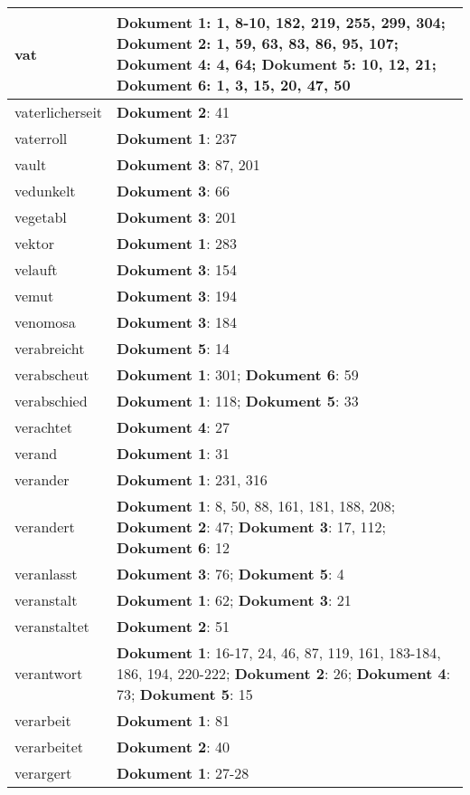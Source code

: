 \documentclass[a5paper]{article}
\begin{document}
\begin{longtable}[l]{|l|p{3in}|}
\hline
vat & \textbf{Dokument 1}: 1, 8-10, 182, 219, 255, 299, 304; \textbf{Dokument 2}: 1, 59, 63, 83, 86, 95, 107; \textbf{Dokument 4}: 4, 64; \textbf{Dokument 5}: 10, 12, 21; \textbf{Dokument 6}: 1, 3, 15, 20, 47, 50 \\
\hline
vaterlicherseit & \textbf{Dokument 2}: 41 \\
\hline
vaterroll & \textbf{Dokument 1}: 237 \\
\hline
vault & \textbf{Dokument 3}: 87, 201 \\
\hline
vedunkelt & \textbf{Dokument 3}: 66 \\
\hline
vegetabl & \textbf{Dokument 3}: 201 \\
\hline
vektor & \textbf{Dokument 1}: 283 \\
\hline
velauft & \textbf{Dokument 3}: 154 \\
\hline
vemut & \textbf{Dokument 3}: 194 \\
\hline
venomosa & \textbf{Dokument 3}: 184 \\
\hline
verabreicht & \textbf{Dokument 5}: 14 \\
\hline
verabscheut & \textbf{Dokument 1}: 301; \textbf{Dokument 6}: 59 \\
\hline
verabschied & \textbf{Dokument 1}: 118; \textbf{Dokument 5}: 33 \\
\hline
verachtet & \textbf{Dokument 4}: 27 \\
\hline
verand & \textbf{Dokument 1}: 31 \\
\hline
verander & \textbf{Dokument 1}: 231, 316 \\
\hline
verandert & \textbf{Dokument 1}: 8, 50, 88, 161, 181, 188, 208; \textbf{Dokument 2}: 47; \textbf{Dokument 3}: 17, 112; \textbf{Dokument 6}: 12 \\
\hline
veranlasst & \textbf{Dokument 3}: 76; \textbf{Dokument 5}: 4 \\
\hline
veranstalt & \textbf{Dokument 1}: 62; \textbf{Dokument 3}: 21 \\
\hline
veranstaltet & \textbf{Dokument 2}: 51 \\
\hline
verantwort & \textbf{Dokument 1}: 16-17, 24, 46, 87, 119, 161, 183-184, 186, 194, 220-222; \textbf{Dokument 2}: 26; \textbf{Dokument 4}: 73; \textbf{Dokument 5}: 15 \\
\hline
verarbeit & \textbf{Dokument 1}: 81 \\
\hline
verarbeitet & \textbf{Dokument 2}: 40 \\
\hline
verargert & \textbf{Dokument 1}: 27-28 \\
\hline

\end{longtable}
\end{document}
